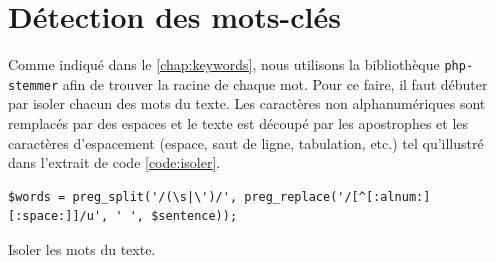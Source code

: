 \section{D\'etection des mots-cl\'es}
Comme indiqu\'e dans le \autoref{chap:keywords}, nous utilisons la biblioth\`eque \texttt{php-stemmer} afin de trouver la racine de chaque mot.
Pour ce faire, il faut d\'ebuter par isoler chacun des mots du texte.
Les caract\`eres non alphanum\'eriques sont remplac\'es par des espaces et le texte est d\'ecoup\'e par les apostrophes et les caract\`eres d'espacement (espace, saut de ligne, tabulation, etc.) tel qu'illustr\'e dans l'extrait de code \ref{code:isoler}.

\begin{lstfloat}[htbp]
\begin{lstlisting}[frame=l]
$words = preg_split('/(\s|\')/', preg_replace('/[^[:alnum:][:space:]]/u', ' ', $sentence));
\end{lstlisting}
\caption{Isoler les mots du texte.}
\label{code:isoler}
\end{lstfloat}

